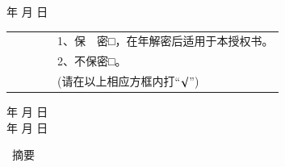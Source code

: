 {{            \song\xiaosi
            \@studentsign \makebox[3cm][s]{} \qquad\qquad\qquad
            \makebox[0.5cm][s]{} 年 \makebox[0.5cm][s]{} 月 \makebox[0.5cm][s]{} 日
            
            \vspace*{1cm}
            \begin{center}\hei\xiaoer{\@authorizedtitle}\end{center}\par
            \vspace{1.2\baselineskip}
            \song{}\par
            \song{}\par
            \begin{tabular}{lll}
                \qquad\qquad& \qquad\quad\qquad&\ \ \ \ 1、保　密□，在\underline{\qquad\qquad}年解密后适用于本授权书。 \\
                \qquad\qquad& \qquad\quad\qquad&\ \ \ \ 2、不保密□。                                       \\
                \qquad\qquad& \qquad\quad\qquad&\ \ \ \ (请在以上相应方框内打``$\surd$'')
            \end{tabular}
            \par
            \vspace{2\baselineskip}
            \song\xiaosi
            \@studentsign \makebox[3cm][s]{} \qquad\qquad\qquad  
            \makebox[0.5cm][s]{} 年 \makebox[0.5cm][s]{} 月 \makebox[0.5cm][s]{} 日 \\
            \indent
            \@teachersign \makebox[3cm][s]{} \qquad\qquad\qquad  
            \makebox[0.5cm][s]{} 年 \makebox[0.5cm][s]{} 月 \makebox[0.5cm][s]{} 日
        }
        \clearpage

         {
            \begin{center}
                \hei\xiaoer{\@title}
            \end{center}\par
            \vspace{0.5\baselineskip}
            \begin{center}
                \hei\xiaoer\ 摘\qquad 要
            \end{center}\par
            \vspace{0.5\baselineskip}
            \song{}\@cabstract
            \vspace{\baselineskip}
            \hangindent=52.3pt\noindent
            \newline\noindent
            {\hei{} \hei\xiaosi\@ckeywords}
        }
        \clearpage
        
}
